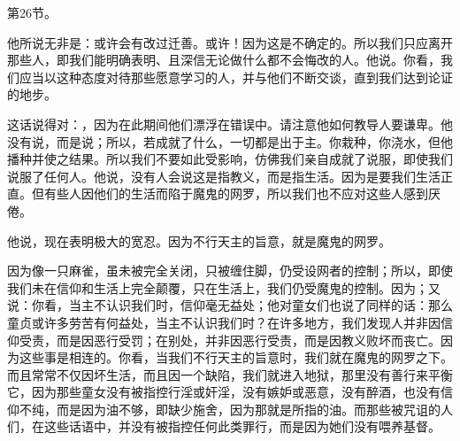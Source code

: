 第26节。\par

他所说无非是：或许会有改过迁善。或许！因为这是不确定的。所以我们只应离开那些人，即我们能明确表明、且深信无论做什么都不会悔改的人。他说。你看，我们应当以这种态度对待那些愿意学习的人，并与他们不断交谈，直到我们达到论证的地步。\par

这话说得对：，因为在此期间他们漂浮在错误中。请注意他如何教导人要谦卑。他没有说，而是说；所以，若成就了什么，一切都是出于主。你栽种，你浇水，但他播种并使之结果。所以我们不要如此受影响，仿佛我们亲自成就了说服，即使我们说服了任何人。他说，没有人会说这是指教义，而是指生活。因为是要我们生活正直。但有些人因他们的生活而陷于魔鬼的网罗，所以我们也不应对这些人感到厌倦。\par

他说，现在表明极大的宽忍。因为不行天主的旨意，就是魔鬼的网罗。\par

因为像一只麻雀，虽未被完全关闭，只被缠住脚，仍受设网者的控制；所以，即使我们未在信仰和生活上完全颠覆，只在生活上，我们仍受魔鬼的控制。因为；又说：你看，当主不认识我们时，信仰毫无益处；他对童女们也说了同样的话：那么童贞或许多劳苦有何益处，当主不认识我们时？在许多地方，我们发现人并非因信仰受责，而是因恶行受罚；在别处，并非因恶行受责，而是因教义败坏而丧亡。因为这些事是相连的。你看，当我们不行天主的旨意时，我们就在魔鬼的网罗之下。而且常常不仅因坏生活，而且因一个缺陷，我们就进入地狱，那里没有善行来平衡它，因为那些童女没有被指控行淫或奸淫，没有嫉妒或恶意，没有醉酒，也没有信仰不纯，而是因为油不够，即缺少施舍，因为那就是所指的油。而那些被咒诅的人们，在这些话语中，并没有被指控任何此类罪行，而是因为她们没有喂养基督。\par

